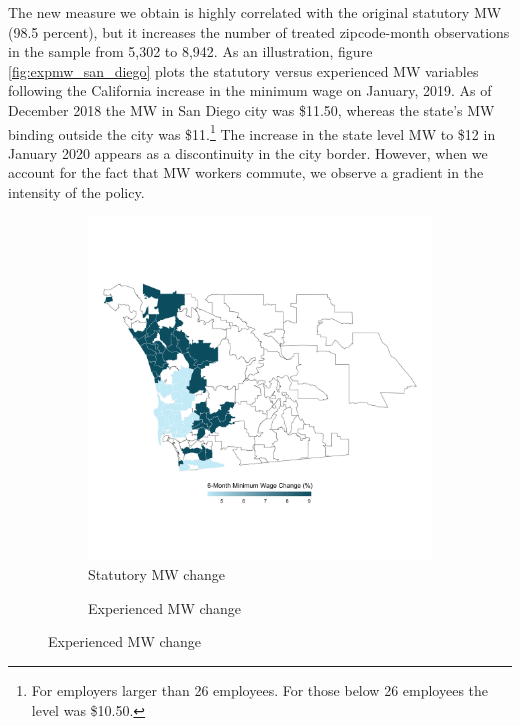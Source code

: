 The new measure we obtain is highly correlated with the original statutory MW (98.5 percent), but it 
increases the number of treated zipcode-month observations in the sample from 5,302 to 8,942. 
As an illustration, figure \ref{fig:expmw_san_diego} plots the statutory versus experienced 
MW variables following the California increase in the minimum wage on January, 2019. As of 
December 2018 the MW in San Diego city was \$11.50, whereas the state's MW binding outside 
the city was \$11.\footnote{For employers larger than 26 employees. For those below 26 
	employees the level was \$10.50.}
The increase in the state level MW to \$12 in January 2020 appears as a discontinuity in the 
city border. However, when we account for the fact that MW workers commute, we observe a 
gradient in the intensity of the policy.

\begin{figure}
	\caption{The California MW increase of January 2019 in San Diego}
	\label{fig:expmw_san_diego}
	\centering
	\begin{subfigure}[b]{0.55\textwidth}
		\caption{Statutory MW change}
		\includegraphics[width = \textwidth]
		{../../analysis/descriptive_maps/output/San_Diego_mw_msa.png}
	\end{subfigure}
	\begin{subfigure}[b]{0.55\textwidth}
		\caption{Experienced MW change}

\end{subfigure}
\end{figure}
